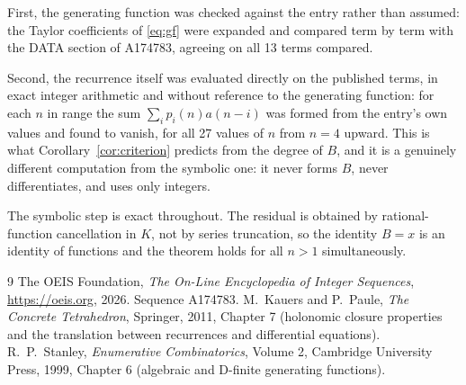 \documentclass[11pt,a4paper]{article}
\theoremstyle{plain}
\theoremstyle{definition}
\begin{document}
First, the generating function was checked against the entry rather than assumed: the
Taylor coefficients of \eqref{eq:gf} were expanded and compared term by term with the DATA
section of A174783, agreeing on all 13 terms compared.

Second, the recurrence itself was evaluated directly on the published terms, in exact
integer arithmetic and without reference to the generating function: for each $n$ in range
the sum $\sum_{i}p_{i}(n)a(n-i)$ was formed from the entry's own values and found to
vanish, for all 27 values of $n$ from $n=4$ upward. This is what
Corollary~\ref{cor:criterion} predicts from the degree of $B$, and it is a genuinely
different computation from the symbolic one: it never forms $B$, never differentiates, and
uses only integers.

The symbolic step is exact throughout. The residual is obtained by rational-function
cancellation in $K$, not by series truncation, so the identity $B=x$ is an
identity of functions and the theorem holds for all $n>1$ simultaneously.

\begin{thebibliography}{9}
 The OEIS Foundation, \emph{The On-Line Encyclopedia of Integer Sequences},
\url{https://oeis.org}, 2026. Sequence A174783.
 M.~Kauers and P.~Paule, \emph{The Concrete Tetrahedron}, Springer, 2011,
Chapter 7 (holonomic closure properties and the translation between recurrences and
differential equations).
 R.~P.~Stanley, \emph{Enumerative Combinatorics}, Volume 2, Cambridge
University Press, 1999, Chapter 6 (algebraic and D-finite generating functions).
\end{thebibliography}
\end{document}
